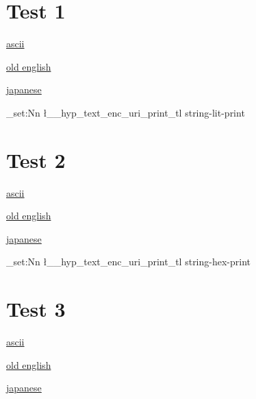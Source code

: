 \documentclass{article}
\begin{document}
\section{Test 1}
\href{https://www.latex-project.org/get/#tex-distributions}{ascii}

\href{http://ang.wikipedia.org/wiki/Elisabeþ_I_Engla_Cwēn}{old english}

\href{http://ja.wikipedia.org/wiki/エリザベス1世_(イングランド女王}{japanese}

\ExplSyntaxOn
\tl_set:Nn \l__hyp_text_enc_uri_print_tl  {string-lit-print}
\ExplSyntaxOff

\section{Test 2}
\href{https://www.latex-project.org/get/#tex-distributions}{ascii}

\href{http://ang.wikipedia.org/wiki/Elisabeþ_I_Engla_Cwēn}{old english}

\href{http://ja.wikipedia.org/wiki/エリザベス1世_(イングランド女王}{japanese}

\ExplSyntaxOn
\tl_set:Nn \l__hyp_text_enc_uri_print_tl  {string-hex-print}
\ExplSyntaxOff

\section{Test 3}
\href{https://www.latex-project.org/get/#tex-distributions}{ascii}

\href{http://ang.wikipedia.org/wiki/Elisabeþ_I_Engla_Cwēn}{old english}

\href{http://ja.wikipedia.org/wiki/エリザベス1世_(イングランド女王}{japanese}
\end{document}
